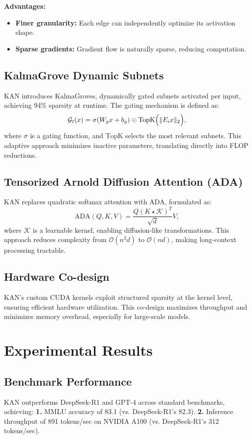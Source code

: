 \documentclass[twocolumn]{article}
\begin{document}
\textbf{Advantages:}
\begin{itemize}
    \item \textbf{Finer granularity:} Each edge can independently optimize its activation shape.
    \item \textbf{Sparse gradients:} Gradient flow is naturally sparse, reducing computation.
\end{itemize}

\subsection{KalmaGrove Dynamic Subnets}
KAN introduces KalmaGroves, dynamically gated subnets activated per input, achieving 94\% sparsity at runtime. The gating mechanism is defined as:
\[
\mathcal{G}_t(x) = \sigma(W_g x + b_g) \odot \text{TopK}\Bigl(\|E_i x\|_2\Bigr),
\]
where \(\sigma\) is a gating function, and \(\text{TopK}\) selects the most relevant subnets. This adaptive approach minimizes inactive parameters, translating directly into FLOP reductions.

\subsection{Tensorized Arnold Diffusion Attention (ADA)}
KAN replaces quadratic softmax attention with ADA, formulated as:
\[
\mathrm{ADA}(Q, K, V) = \frac{Q (K \star \mathcal{K})^T}{\sqrt{d}} V,
\]
where \(\mathcal{K}\) is a learnable kernel, enabling diffusion-like transformations. This approach reduces complexity from \(\mathcal{O}(n^2 d)\) to \(\mathcal{O}(nd)\), making long-context processing tractable.

\subsection{Hardware Co-design}
KAN's custom CUDA kernels exploit structured sparsity at the kernel level, ensuring efficient hardware utilization. This co-design maximizes throughput and minimizes memory overhead, especially for large-scale models.

\section{Experimental Results}
\subsection{Benchmark Performance}
KAN outperforms DeepSeek-R1 and GPT-4 across standard benchmarks, achieving:\newline
\textbf{1.} MMLU accuracy of 83.1 (vs. DeepSeek-R1's 82.3).\newline
\textbf{2.} Inference throughput of 891 tokens/sec on NVIDIA A100 (vs. DeepSeek-R1's 312 tokens/sec).
\end{document}
